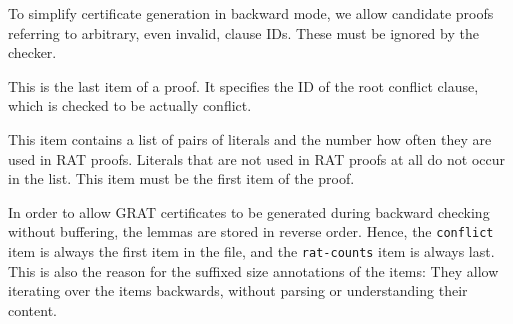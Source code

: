 \documentclass{llncs}
\newcommand{\lsti}{\lstinline[language={},literate={}]}
\begin{document}
\begin{description}
      To simplify certificate generation in backward mode, we allow candidate proofs referring to arbitrary, even invalid, clause IDs. These must be ignored by the checker.
    \item[conflict] This is the last item of a proof. It specifies the ID of the root conflict clause, which is checked to be actually conflict.
    \item[rat-counts] This item contains a list of pairs of literals and the number how often they are used in RAT proofs. 
      Literals that are not used in RAT proofs at all do not occur in the list. This item must be the first item of the proof. 
\end{description}

In order to allow GRAT certificates to be generated during backward checking without buffering, the lemmas are stored in reverse order.
Hence, the \lsti{conflict} item is always the first item in the file, and the \lsti{rat-counts} item is always last.
This is also the reason for the suffixed size annotations of the items: They allow iterating over the items backwards, without parsing or understanding their content.
\end{document}

